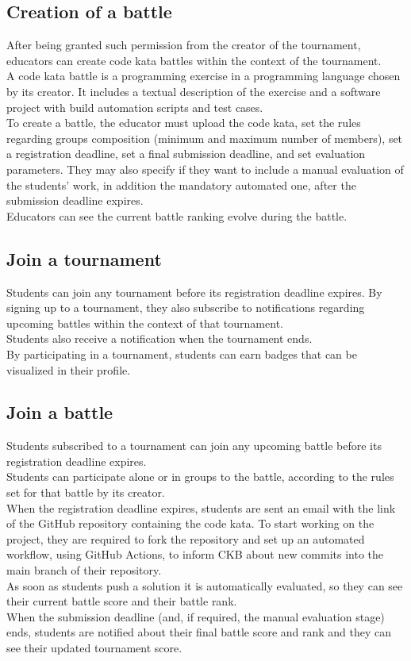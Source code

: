 \subsection{Creation of a battle}
After being granted such permission from the creator of the tournament, educators can create code kata battles within the
context of the tournament.\\
A code kata battle is a programming exercise in a programming language chosen by its creator. It includes a textual description
of the exercise and a software project with build automation scripts and test cases.\\
To create a battle, the educator must upload the code kata, set the rules regarding groups composition (minimum and maximum 
number of members), set a registration deadline, set a final submission deadline, and set evaluation parameters. They may also 
specify if they want to include a manual evaluation of the students' work, in addition the mandatory automated one, after the 
submission deadline expires.\\
Educators can see the current battle ranking evolve during the battle.\\

\subsection{Join a tournament}
Students can join any tournament before its registration deadline expires. By signing up to a tournament, they also 
subscribe to notifications regarding upcoming battles within the context of that tournament.\\
Students also receive a notification when the tournament ends.\\
By participating in a tournament, students can earn badges that can be visualized in their profile.\\

\subsection{Join a battle}
Students subscribed to a tournament can join any upcoming battle before its registration deadline expires.\\
Students can participate alone or in groups to the battle, according to the rules set for that battle by its creator.\\
When the registration deadline expires, students are sent an email with the link of the GitHub repository containing the 
code kata. To start working on the project, they are required to fork the repository and set up an automated workflow, 
using GitHub Actions, to inform CKB about new commits into the main branch of their repository.\\
As soon as students push a solution it is automatically evaluated, so they can see their current battle score and their 
battle rank.\\
When the submission deadline (and, if required, the manual evaluation stage) ends, students are notified about their final 
battle score and rank and they can see their updated tournament score.\\


